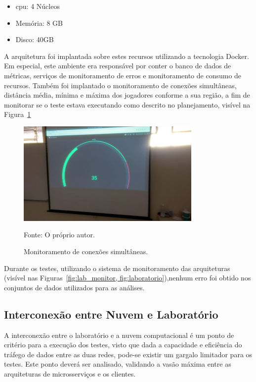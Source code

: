 \begin{itemize}
  \item \ac{cpu}: 4 Núcleos
  \item Memória: 8 GB
  \item Disco: 40GB
\end{itemize}

A arquitetura foi implantada sobre estes recursos utilizando a tecnologia Docker. Em especial, este ambiente era responsável por conter o banco de dados de métricas, serviços de monitoramento de erros e monitoramento de consumo de recursos.
%
Também foi implantado o monitoramento de conexões simultâneas, distância média, mínima e máxima dos jogadores conforme a sua região, a fim de monitorar se o teste estava executando como descrito no planejamento, visível na Figura~\ref{fig:lab_monitor}

\begin{figure}[htb!]
  \caption{Monitoramento de conexões simultâneas.}
  \label{fig:lab_monitor}
  \includegraphics[width=0.8\textwidth]{figuras/network/metrics.jpg}
  \centering

  Fonte: O próprio autor.
\end{figure}

Durante os testes, utilizando o sistema de monitoramento das arquiteturas (visível nas Figuras~\ref{fig:lab_monitor, fig:laboratorio}),nenhum erro foi obtido nos conjuntos de dados utilizados para as análises.

\subsection{Interconexão entre Nuvem e Laboratório}
\label{sec:nuvem_lab}

A interconexão entre o laboratório e a nuvem computacional é um ponto de critério para a execução dos testes, visto que dada a capacidade e eficiência do tráfego de dados entre as duas redes, pode-se existir um gargalo limitador para os testes.
%
Este ponto deverá ser analisado, validando a vasão máxima entre as arquiteturas de microsserviços e os clientes.

